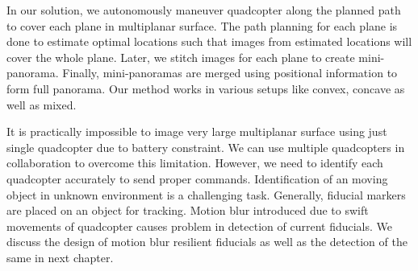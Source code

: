 In our solution, we autonomously maneuver quadcopter along the planned path to
cover each plane in multiplanar surface. The path planning for each plane is
done to estimate optimal locations such that images from estimated locations will cover
the whole plane. Later, we stitch images for each plane to create mini-panorama.
Finally, mini-panoramas are merged using positional information to form full panorama.
Our method works in various setups like convex, concave as well as mixed.

It is practically impossible to image very large multiplanar surface using
just single quadcopter due to battery constraint. We can use multiple
quadcopters in collaboration to overcome this limitation. However, we need to
identify each quadcopter accurately to send proper commands. Identification of
an moving object in unknown environment is a challenging task. Generally, 
fiducial markers are placed on an object for tracking. Motion blur introduced
due to swift movements of quadcopter causes problem in detection of current
fiducials. We discuss the design of motion blur resilient fiducials as well as
the detection of the same in next chapter.

